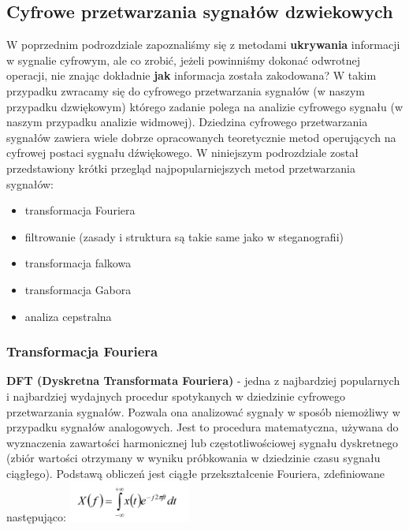 \documentclass[a4paper,titleauthor]{mwart}
\begin{document}
\subsection{Cyfrowe przetwarzania sygnałów dzwiekowych}

W poprzednim podrozdziale zapoznaliśmy się z metodami \textbf{ukrywania} informacji w sygnalie cyfrowym, ale co zrobić, jeżeli powinniśmy dokonać odwrotnej operacji, nie znając dokładnie \textbf{jak} informacja została zakodowana?\newline \newline
W takim przypadku zwracamy się do cyfrowego przetwarzania sygnałów (w naszym przypadku dzwiękowym) którego zadanie polega na analizie cyfrowego sygnału (w naszym przypadku analizie widmowej).\newline \newline
Dziedzina cyfrowego przetwarzania sygnałów zawiera wiele dobrze opracowanych teoretycznie metod operujących na cyfrowej postaci sygnału dźwiękowego. W niniejszym podrozdziale został przedstawiony krótki przegląd najpopularniejszych metod przetwarzania sygnałów:

\begin{itemize}
	\item transformacja Fouriera
	\item filtrowanie (zasady i struktura są takie same jako w steganografii)
	\item transformacja falkowa
	\item transformacja Gabora
	\item analiza cepstralna
\end{itemize}	

\subsubsection{Transformacja Fouriera}

\textbf{DFT (Dyskretna Transformata Fouriera)} - jedna z najbardziej popularnych i najbardziej wydajnych procedur spotykanych w dziedzinie cyfrowego przetwarzania sygnałów.\newline \newline
 Pozwala ona analizować sygnały w sposób niemożliwy w przypadku sygnałów analogowych. Jest to procedura matematyczna, używana do wyznaczenia zawartości harmonicznej lub częstotliwościowej sygnału dyskretnego (zbiór wartości otrzymany w wyniku próbkowania w dziedzinie czasu sygnału ciągłego).\newline \newline
 Podstawą obliczeń jest ciągłe przekształcenie Fouriera, zdefiniowane następująco:\newline
	\includegraphics[width=0.3\textwidth]{fourier1}
\end{document}
